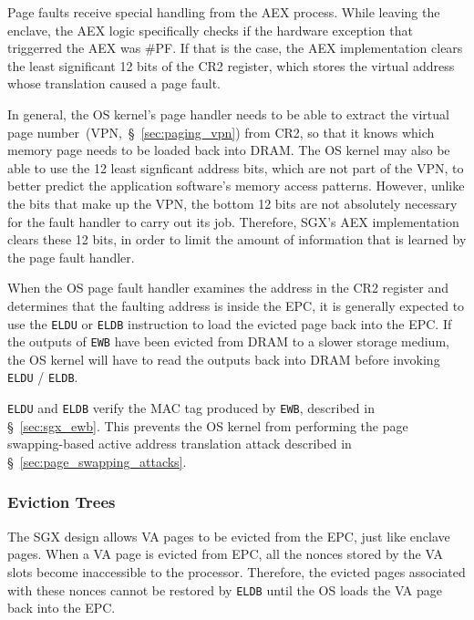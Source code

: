 Page faults receive special handling from the AEX process. While leaving the
enclave, the AEX logic specifically checks if the hardware exception that
triggerred the AEX was \#PF. If that is the case, the AEX implementation clears
the least significant 12 bits of the CR2 register, which stores the virtual
address whose translation caused a page fault.

In general, the OS kernel's page handler needs to be able to extract the
virtual page number~(VPN,~\S~\ref{sec:paging_vpn}) from CR2, so that it knows
which memory page needs to be loaded back into DRAM. The OS kernel may also be
able to use the 12 least signficant address bits, which are not part of the
VPN, to better predict the application software's memory access patterns.
However, unlike the bits that make up the VPN, the bottom 12 bits are not
absolutely necessary for the fault handler to carry out its job. Therefore,
SGX's AEX implementation clears these 12 bits, in order to limit the amount of
information that is learned by the page fault handler.


When the OS page fault handler examines the address in the CR2 register and
determines that the faulting address is inside the EPC, it is generally
expected to use the \texttt{ELDU} or \texttt{ELDB} instruction to load the
evicted page back into the EPC. If the outputs of \texttt{EWB} have been
evicted from DRAM to a slower storage medium, the OS kernel will have to read
the outputs back into DRAM before invoking \texttt{ELDU} / \texttt{ELDB}.

\texttt{ELDU} and \texttt{ELDB} verify the MAC tag produced by \texttt{EWB},
described in \S~\ref{sec:sgx_ewb}. This prevents the OS kernel from performing
the page swapping-based active address translation attack described in
\S~\ref{sec:page_swapping_attacks}.


\subsubsection{Eviction Trees}
\label{sec:sgx_eviction_trees}

The SGX design allows VA pages to be evicted from the EPC, just like enclave
pages. When a VA page is evicted from EPC, all the nonces stored by the VA
slots become inaccessible to the processor. Therefore, the evicted pages
associated with these nonces cannot be restored by \texttt{ELDB} until the
OS loads the VA page back into the EPC.


